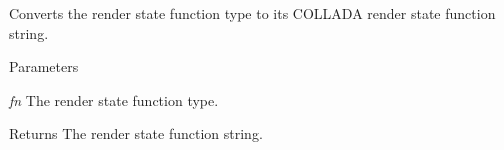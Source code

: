 \label{namespaceFUDaePassStateFunction_a779cb89b2e35a4f2ab53a669212f41a9}
Converts the render state function type to its COLLADA render state function string. 
\begin{DoxyParams}{Parameters}
\item[{\em fn}]The render state function type. \end{DoxyParams}
\begin{DoxyReturn}{Returns}
The render state function string. 
\end{DoxyReturn}

